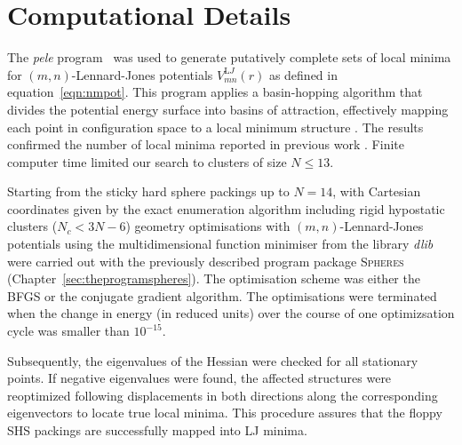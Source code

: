 \section{Computational Details}

The \textit{pele} program~\autocite{_pelePythonenergy_2017} was used to generate putatively
complete sets of local minima for $(m,n)$-Lennard-Jones potentials 
$V_{mn}^{\mathrm LJ}(r)$ as defined in equation~\eqref{eqn:nmpot}.
This program  applies a basin-hopping algorithm that divides the potential energy
surface into basins of attraction, effectively mapping each point in
configuration space to a local minimum structure
\autocite{Li_MonteCarlominimizationapproach_1987,waless99,Wales_GlobalOptimizationBasinHopping_1997}.  The results confirmed the
number of local minima reported in previous work \autocite{Doye_Saddlepointsdynamics_2002}.
Finite computer time limited our search to clusters of size $N \leq 13$.

Starting from the sticky hard sphere packings up to $N=14$, with Cartesian
coordinates given by the exact enumeration algorithm
\autocite{Hoy_Structurefinitesphere_2012} including rigid hypostatic clusters
($N_c<3N-6$) \autocite{Holmes-Cerfon_EnumeratingRigidSphere_2016} geometry
optimisations with $(m,n)$-Lennard-Jones potentials using the multidimensional
function minimiser from the \Cpp library \textit{dlib}
\autocite{King_DlibmlMachineLearning_2009} were carried out with the previously
described program package \textsc{Spheres}
(Chapter~\ref{sec:theprogramspheres}). The optimisation scheme was either the
\ac{BFGS} or the conjugate gradient algorithm. The optimisations were terminated when the
change in energy (in reduced units) over the course of one optimizsation cycle
was smaller than $10^{-15}$. 

Subsequently, the eigenvalues of the Hessian were checked
for all stationary points. If negative eigenvalues were found, the affected
structures were reoptimized following displacements in both directions along
the corresponding eigenvectors to locate true local minima. This procedure assures
that the floppy \ac{SHS} packings are successfully mapped into LJ minima.

